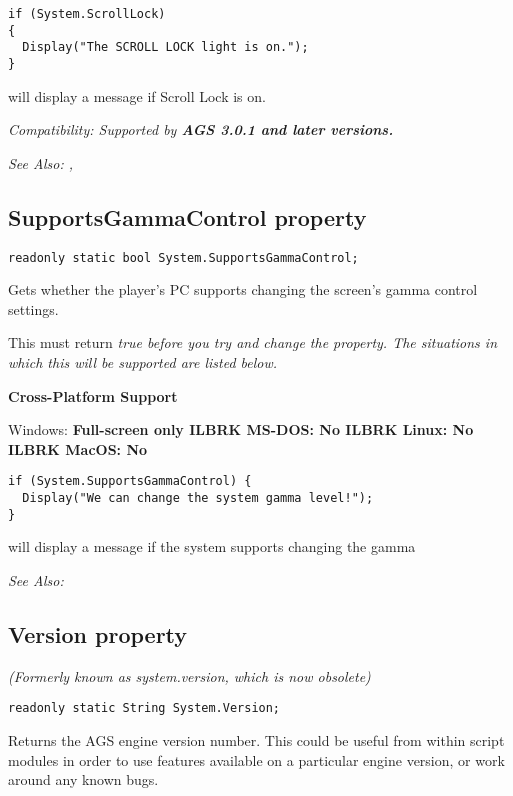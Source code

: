 \begin{verbatim}
if (System.ScrollLock)
{
  Display("The SCROLL LOCK light is on.");
}
\end{verbatim}
will display a message if Scroll Lock is on.

\it{Compatibility:} Supported by \bf{AGS 3.0.1} and later versions.

\it{See Also:} ,


\subsection{SupportsGammaControl property}\label{System.SupportsGammaControl}%

\begin{verbatim}
readonly static bool System.SupportsGammaControl;
\end{verbatim}
Gets whether the player's PC supports changing the screen's gamma control settings.

This must return \it{true} before you try and change the  property.
The situations in which this will be supported are listed below.

\bf{Cross-Platform Support}

Windows: \bf{ Full-screen only }ILBRK
MS-DOS: \bf{ No }ILBRK
Linux: \bf{ No }ILBRK
MacOS: \bf{ No }

\begin{verbatim}
if (System.SupportsGammaControl) {
  Display("We can change the system gamma level!");
}
\end{verbatim}
will display a message if the system supports changing the gamma

\it{See Also:} 


\subsection{Version property}\label{System.Version}%

\it{(Formerly known as system.version, which is now obsolete)}

\begin{verbatim}
readonly static String System.Version;
\end{verbatim}
Returns the AGS engine version number. This could be useful from within script modules
in order to use features available on a particular engine version, or work around
any known bugs.

